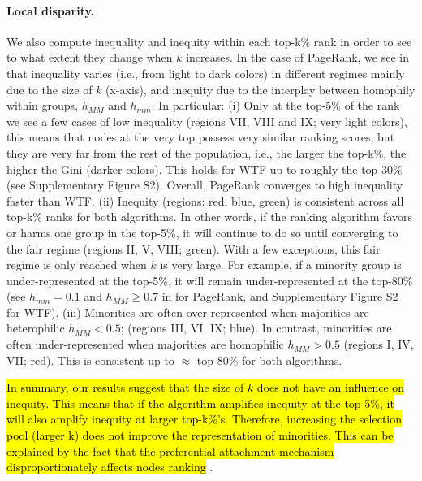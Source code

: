 \documentclass[fleqn,10pt]{wlscirep}
\begin{document}
\paragraph{Local disparity.}%
We also compute inequality and inequity within each top-k\% rank in order to see to what extent they change when $k$ increases. %
In the case of PageRank, we see in  that inequality varies (i.e., from light to dark colors) in different regimes mainly due to the size of $k$ (x-axis), and inequity due to the interplay between homophily within groups, $h_{MM}$ and $h_{mm}$. 
In particular: (i) Only at the top-5\% of the rank we see a few cases of low inequality (regions VII, VIII and IX; very light colors), this means that nodes at the very top possess very similar ranking scores, but they are very far from the rest of the population, i.e., the larger the top-k\%, the higher the Gini (darker colors). This holds for WTF up to roughly the top-30\% (see Supplementary Figure S2). Overall, PageRank converges to high inequality faster than WTF.
%
(ii) Inequity (regions: red, blue, green) is consistent across all top-k\% ranks for both algorithms. In other words, if the ranking algorithm favors or harms one group in the top-5\%, it will continue to do so until converging to the fair regime (regions II, V, VIII; green). With a few exceptions, this fair regime is only reached when $k$ is very large. For example, if a minority group is under-represented at the top-5\%, it will remain under-represented at the top-80\% (see $h_{mm}=0.1$ and $h_{MM}\geq0.7$ in  for PageRank, and Supplementary Figure S2 for WTF).
%
(iii) Minorities are often over-represented when majorities are heterophilic $h_{MM}<0.5$; (regions III, VI, IX; blue). In contrast, minorities are often under-represented when majorities are homophilic $h_{MM}>0.5$ (regions I, IV, VII; red). This is consistent up to $\approx$ top-$80\%$ for both algorithms.
%

\hl{In summary, our results suggest that the size of $k$ does not have an influence on inequity. This means that if the algorithm amplifies inequity at the top-5\%, it will also amplify inequity at larger top-k\%'s.
%
Therefore, increasing the selection pool (larger k) does not improve the representation of minorities. %
This can be explained by the fact that the preferential attachment mechanism disproportionately affects nodes ranking} \cite{ghoshal2011ranking}. 
\end{document}
